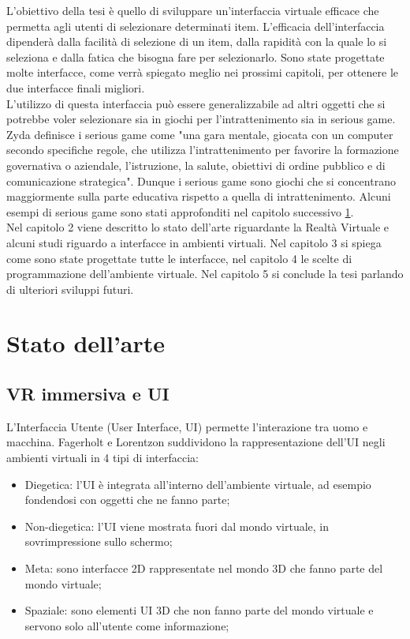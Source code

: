 \documentclass[target=bach,aauheader=]{thud}
\begin{document}
L'obiettivo della tesi è quello di sviluppare un'interfaccia virtuale efficace che permetta agli utenti di selezionare determinati item.
L'efficacia dell'interfaccia dipenderà dalla facilità di selezione di un item, dalla rapidità con la quale lo si seleziona e dalla fatica che bisogna fare per selezionarlo.
Sono state progettate molte interfacce, come verrà spiegato meglio nei prossimi capitoli, per ottenere le due interfacce finali migliori. \\

L'utilizzo di questa interfaccia può essere generalizzabile ad altri oggetti che si potrebbe voler selezionare sia in giochi per l'intrattenimento sia in serious game.
Zyda \cite{Zyda} definisce i serious game come "una gara mentale, giocata con un computer secondo specifiche regole, che utilizza l'intrattenimento per favorire la formazione governativa o aziendale, l'istruzione, la salute, obiettivi di ordine pubblico e di comunicazione strategica".
Dunque i serious game sono giochi che si concentrano maggiormente sulla parte educativa rispetto a quella di intrattenimento.
Alcuni esempi di serious game sono stati approfonditi nel capitolo successivo \ref{art}. \\

Nel capitolo 2 viene descritto lo stato dell'arte riguardante la Realtà Virtuale e alcuni studi riguardo a interfacce in ambienti virtuali.
Nel capitolo 3 si spiega come sono state progettate tutte le interfacce, nel capitolo 4 le scelte di programmazione dell'ambiente virtuale.
Nel capitolo 5 si conclude la tesi parlando di ulteriori sviluppi futuri.

\chapter{Stato dell'arte} %
\label{art}
\section{VR immersiva e UI}
L'Interfaccia Utente (User Interface, UI) permette l'interazione tra uomo e macchina.
Fagerholt e Lorentzon \cite{Fagerholt} suddividono la rappresentazione dell'UI negli ambienti virtuali in 4 tipi di interfaccia:
\begin{itemize}
    \item Diegetica: l'UI è integrata all'interno dell'ambiente virtuale, ad esempio fondendosi con oggetti che ne fanno parte;
    \item Non-diegetica: l'UI viene mostrata fuori dal mondo virtuale, in sovrimpressione sullo schermo;
    \item Meta: sono interfacce 2D rappresentate nel mondo 3D che fanno parte del mondo virtuale;
    \item Spaziale: sono elementi UI 3D che non fanno parte del mondo virtuale e servono solo all'utente come informazione;
\end{itemize} 
\end{document}

